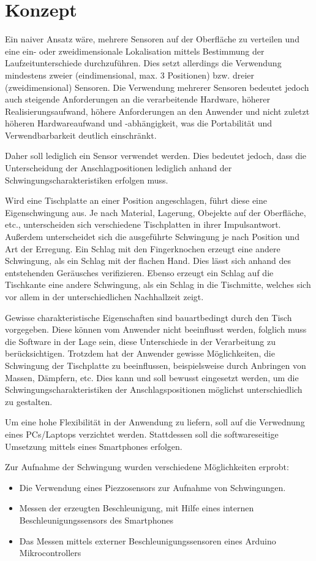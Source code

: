 \section{Konzept}
\label{sec:Konzept}
Ein naiver Ansatz wäre, mehrere Sensoren auf der Oberfläche zu verteilen und eine ein- oder zweidimensionale Lokalisation mittels Bestimmung der Laufzeitunterschiede durchzuführen.
Dies setzt allerdings die Verwendung mindestens zweier (eindimensional, max. 3 Positionen) bzw. dreier (zweidimensional) Sensoren. 
Die Verwendung mehrerer Sensoren bedeutet jedoch auch steigende Anforderungen an die verarbeitende Hardware, höherer Realisierungsaufwand, höhere Anforderungen an den Anwender und nicht zuletzt höheren Hardwareaufwand und -abhängigkeit, was die Portabilität und Verwendbarbarkeit deutlich einschränkt.

Daher soll lediglich ein Sensor verwendet werden. Dies bedeutet jedoch, dass die Unterscheidung der Anschlagpositionen lediglich anhand der Schwingungscharakteristiken erfolgen muss.

Wird eine Tischplatte an einer Position angeschlagen, führt diese eine Eigenschwingung aus.
Je nach Material, Lagerung, Obejekte auf der Oberfläche, etc., unterscheiden sich verschiedene Tischplatten in ihrer Impulsantwort.
Außerdem unterscheidet sich die ausgeführte Schwingung je nach Position und Art der Erregung.
Ein Schlag mit den Fingerknochen erzeugt eine andere Schwingung, als ein Schlag mit der flachen Hand.
Dies lässt sich anhand des entstehenden Geräusches verifizieren.
Ebenso erzeugt ein Schlag auf die Tischkante eine andere Schwingung, als ein Schlag in die Tischmitte, welches sich vor allem in der unterschiedlichen Nachhallzeit zeigt.

Gewisse charakteristische Eigenschaften sind bauartbedingt durch den Tisch vorgegeben. 
Diese können vom Anwender nicht beeinflusst werden, folglich muss die Software in der Lage sein, diese Unterschiede in der Verarbeitung zu berücksichtigen. 
Trotzdem hat der Anwender gewisse Möglichkeiten, die Schwingung der Tischplatte zu beeinflussen, beispielsweise durch Anbringen von Massen, Dämpfern, etc.
Dies kann und soll bewusst eingesetzt werden, um die Schwingungscharakteristiken der Anschlagspositionen möglichst unterschiedlich zu gestalten.  

Um eine hohe Flexibilität in der Anwendung zu liefern, soll auf die Verwednung eines PCs/Laptops verzichtet werden. Stattdessen soll die softwareseitige Umsetzung mittels eines Smartphones erfolgen.

Zur Aufnahme der Schwingung wurden verschiedene Möglichkeiten erprobt:
\begin{itemize}
	\item Die Verwendung eines Piezzosensors zur Aufnahme von Schwingungen.
	\item Messen der erzeugten Beschleunigung, mit Hilfe eines internen Beschleunigungssensors des Smartphones
	\item Das Messen mittels externer Beschleunigungssensoren eines Arduino Mikrocontrollers  
\end{itemize}

